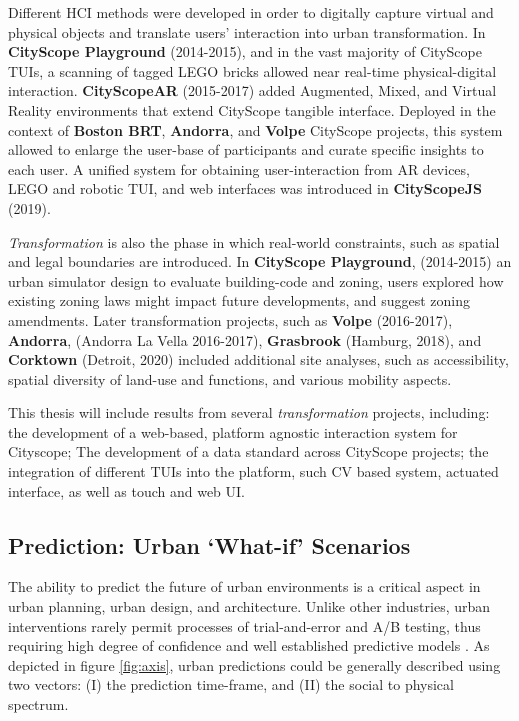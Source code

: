 {Different HCI methods were developed in order to digitally capture virtual and physical objects and translate users' interaction into urban transformation. In \textbf{CityScope Playground} (2014-2015), and in the vast majority of CityScope TUIs, a scanning of tagged LEGO bricks allowed near real-time physical-digital interaction. \textbf{CityScopeAR} (2015-2017) added Augmented, Mixed, and Virtual Reality environments that extend CityScope tangible interface. Deployed in the context of \textbf{Boston BRT}, \textbf{Andorra}, and \textbf{Volpe} CityScope projects, this system allowed to enlarge the user-base of participants and curate specific insights to each user. A unified system for obtaining user-interaction from AR devices, LEGO and robotic TUI, and web interfaces was introduced in \textbf{CityScopeJS} (2019).}


{\textit{Transformation} is also the phase in which real-world constraints, such as spatial and legal boundaries are introduced. In \textbf{CityScope Playground}, (2014-2015) an urban simulator design to evaluate building-code and zoning, users explored how existing zoning laws might impact future developments, and suggest zoning amendments. Later transformation projects, such as \textbf{Volpe} (2016-2017), \textbf{Andorra}, (Andorra La Vella 2016-2017), \textbf{Grasbrook} (Hamburg, 2018), and \textbf{Corktown} (Detroit, 2020) included additional site analyses, such as accessibility, spatial diversity of land-use and functions, and various mobility aspects.}

{This thesis will include results from several \textit{transformation} projects, including: the development of a web-based, platform agnostic interaction system for Cityscope; The development of a data standard across CityScope projects; the integration of different TUIs into the platform, such CV based system, actuated interface, as well as touch and web UI.}


\subsection{Prediction: Urban `What-if' Scenarios}

{The ability to predict the future of urban environments is a critical aspect in urban planning, urban design, and architecture. Unlike other industries, urban interventions rarely permit processes of trial-and-error and A/B testing, thus requiring high degree of confidence and well established predictive models \cite{doi:10.1080/14649357.2015.1127994}. As depicted in figure \ref{fig:axis}, urban predictions could be generally described using two vectors: (I) the prediction time-frame, and (II) the social to physical spectrum.}

